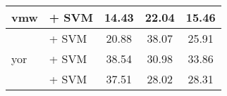 \begin{longtable}{llccc}
    vmw                                & \citep{wang2024multilingual} + SVM                                 & 14.43                                & 22.04              & 15.46             \\
    \midrule
    \multirow{3}{*}{yor}               & \citep{feng2022languageagnosticbertsentenceembedding} + SVM        & 20.88                                & 38.07              & 25.91             \\
                                       & \citep{wang2024multilingual} + SVM                                 & 38.54                                & 30.98              & 33.86             \\
                                       & \citep{reimers2020makingmonolingualsentenceembeddings} + SVM       & 37.51                                & 28.02              & 28.31             \\




    \bottomrule
\end{longtable}
